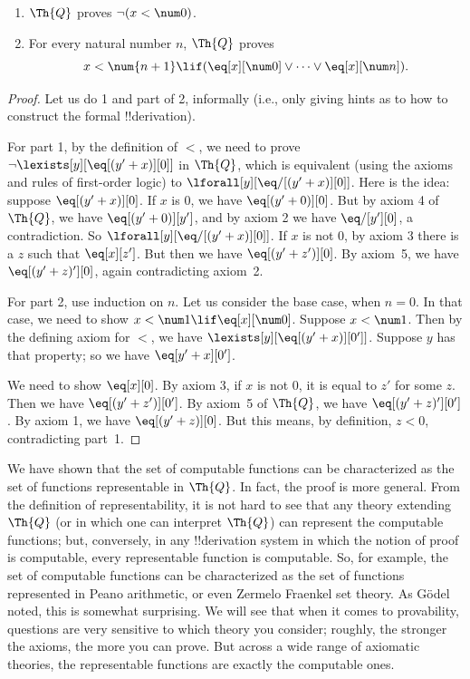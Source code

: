 \documentclass[../../../include/open-logic-section]{subfiles}
\begin{document}
\begin{lem}
\begin{enumerate}
\item $\Th{Q}$ proves $\lnot (x < \num 0)$.
\item For every natural number $n$, $\Th{Q}$ proves
\[
x < \num {n+1} \lif (\eq[x][\num 0] \lor \dots \lor \eq[x][\num n]).
\]
\end{enumerate}
\end{lem}

\begin{proof}
Let us do 1 and part of 2, informally (i.e., only giving hints as to
how to construct the formal !!{derivation}).

For part 1, by the definition of $<$, we need to prove $\lnot
\lexists[y][\eq[(y'+x)][0]]$ in $\Th{Q}$, which is equivalent (using
the axioms and rules of first-order logic) to $\lforall[y][\eq/[(y' +
    x)][0]]$. Here is the idea: suppose $\eq[(y'+x)][0]$. If $x$ is 0,
we have $\eq[(y' + 0)][0]$. But by axiom 4 of $\Th{Q}$, we have
$\eq[(y' + 0)][y']$, and by axiom 2 we have $\eq/[y'][0]$, a
contradiction. So $\lforall[y][\eq/[(y' +x)][0]]$. If $x$ is not $0$,
by axiom 3 there is a $z$ such that $\eq[x][z']$. But then we have
$\eq[(y' + z')][0]$. By axiom~5, we have $\eq[(y' + z)'][0]$, again
contradicting axiom~2.

For part 2, use induction on $n$. Let us consider the base case, when
$n =0$. In that case, we need to show $x < \num 1 \lif \eq[x][\num
  0]$. Suppose $x < \num 1$. Then by the defining axiom for $<$, we
have $\lexists[y][\eq[(y'+x)][0']]$. Suppose $y$ has that property; so
we have $\eq[y'+x][0']$.

We need to show $\eq[x][0]$. By axiom 3, if $x$ is not 0, it is equal
to $z'$ for some $z$. Then we have $\eq[(y' + z')][0']$. By axiom~5 of
  $\Th{Q}$, we have $\eq[(y'+z)'][0']$. By axiom 1, we have $\eq[(y' +
    z)][0]$. But this means, by definition, $z < 0$, contradicting
  part~1.
\end{proof}

\begin{explain}
We have shown that the set of computable functions can be
characterized as the set of functions representable in $\Th{Q}$. In fact,
the proof is more general. From the definition of representability, it
is not hard to see that any theory extending $\Th{Q}$ (or in which one can
interpret $\Th{Q}$) can represent the computable functions; but,
conversely, in any !!{derivation} system in which the notion of proof is
computable, every representable function is computable. So, for
example, the set of computable functions can be characterized as the
set of functions represented in Peano arithmetic, or even Zermelo
Fraenkel set theory. As G\"odel noted, this is somewhat surprising.
We will see that when it comes to provability, questions are very
sensitive to which theory you consider; roughly, the stronger the
axioms, the more you can prove. But across a wide range of axiomatic
theories, the representable functions are exactly the computable ones.
\end{explain}
\end{document}
